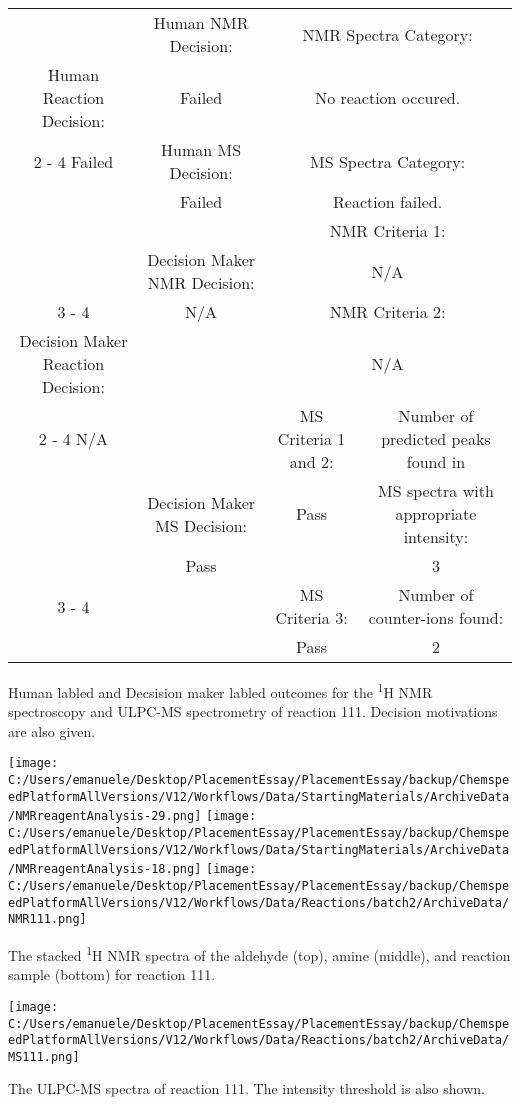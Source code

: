 \documentclass{article}%
\begin{document}
\begin{Decision Table}[H]%
\begin{tabular}{|c|c|c|c|}%
\hline%
&Human NMR Decision:&\multicolumn{2}{|c|}{NMR Spectra Category:}\\%
Human Reaction Decision:&Failed&\multicolumn{2}{|c|}{No reaction occured.}\\%
\cline{2%
-%
4}%
Failed&Human MS Decision:&\multicolumn{2}{|c|}{MS Spectra Category:}\\%
&Failed&\multicolumn{2}{|c|}{Reaction failed.}\\%
\hline%
&&\multicolumn{2}{|c|}{NMR Criteria 1:}\\%
&Decision Maker NMR Decision:&\multicolumn{2}{|c|}{N/A}\\%
\cline{3%
-%
4}%
&N/A&\multicolumn{2}{|c|}{NMR Criteria 2:}\\%
Decision Maker Reaction Decision:&&\multicolumn{2}{|c|}{N/A}\\%
\cline{2%
-%
4}%
N/A&&MS Criteria 1 and 2:&Number of predicted peaks found in\\%
&Decision Maker MS Decision:&Pass&MS spectra with appropriate intensity:\\%
&Pass&&3\\%
\cline{3%
-%
4}%
&&MS Criteria 3:&Number of counter{-}ions found:\\%
&&Pass&2\\%
\hline%
\end{tabular}%
\caption{Human labled and Decsision maker labled outcomes for the \textsuperscript{1}H NMR spectroscopy and ULPC-MS spectrometry of reaction 111. Decision motivations are also given.}%
\end{Decision Table}%
\begin{NMR Spectra}[H]%
\begin{center}%
\texttt{[image: C:/Users/emanuele/Desktop/PlacementEssay/PlacementEssay/backup/ChemspeedPlatformAllVersions/V12/Workflows/Data/StartingMaterials/ArchiveData/NMRreagentAnalysis-29.png]}\hfill%
\texttt{[image: C:/Users/emanuele/Desktop/PlacementEssay/PlacementEssay/backup/ChemspeedPlatformAllVersions/V12/Workflows/Data/StartingMaterials/ArchiveData/NMRreagentAnalysis-18.png]}\hfill%
\texttt{[image: C:/Users/emanuele/Desktop/PlacementEssay/PlacementEssay/backup/ChemspeedPlatformAllVersions/V12/Workflows/Data/Reactions/batch2/ArchiveData/NMR111.png]}\hfill%
\end{center}%
\caption{The stacked \textsuperscript{1}H NMR spectra of the aldehyde (top), amine (middle), and reaction sample (bottom) for reaction 111.}%
\end{NMR Spectra}%
\begin{MS Spectra}[H]%
\begin{center}%
\texttt{[image: C:/Users/emanuele/Desktop/PlacementEssay/PlacementEssay/backup/ChemspeedPlatformAllVersions/V12/Workflows/Data/Reactions/batch2/ArchiveData/MS111.png]}\hfill%
\end{center}%
\caption{The ULPC-MS spectra of reaction 111. The intensity threshold is also shown.}%
\end{MS Spectra}%
\end{document}
